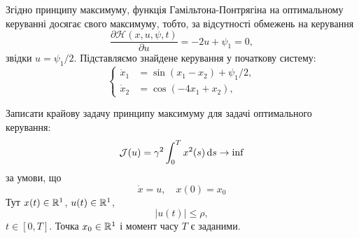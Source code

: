 \begin{solution}
    Згідно принципу максимуму, функція Гамільтона-Понтрягіна на оптимальному керуванні досягає свого максимуму, тобто, за відсутності обмежень на керування
    \begin{equation} 
        \dfrac{\partial \mathcal{H}(x, u, \psi, t)}{\partial u} = -2 u + \psi_1 = 0,
    \end{equation}
    звідки $u = \psi_1 / 2$. Підставляємо знайдене керування у початкову систему:
    \[ \left\{ \begin{aligned}
        \dot x_1 &= \sin(x_1 - x_2) + \psi_1 / 2, \\
        \dot x_2 &= \cos(-4x_1 + x_2),
    \end{aligned} \right. \]
\end{solution}

\begin{problem}
    Записати крайову задачу принципу максимуму для задачі оптимального керування:
    \begin{equation*}
        \mathcal{J}(u) = \gamma^2 \int_0^T x^2(s) \mathop{}\!\mathrm{d} s \to \inf
    \end{equation*}
    за умови, що
    \begin{equation*}
        \dot x = u, \quad x(0) = x_0
    \end{equation*}
    Тут $x(t) \in \mathbb{R}^1$, $u(t) \in \mathbb{R}^1$,
    \begin{equation*}
        |u(t)|\le \rho,
    \end{equation*}
    $t \in [0, T]$. Точка $x_0 \in \mathbb{R}^1$ і момент часу $T$ є заданими.
\end{problem}

